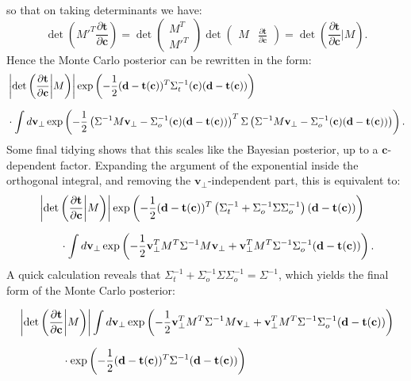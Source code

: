\documentclass[withindex,glossary]{cam-thesis}
\renewcommand{\vec}[1]{\textbf{#1}} %
\begin{document}
so that on taking determinants we have:
\begin{equation}
\det\left( {M'}^T \frac{\partial \vec{t}}{\partial \vec{c}}\right) = \det\begin{pmatrix} M^T \\ {M'}^T \end{pmatrix}\det\begin{pmatrix} M & \displaystyle \frac{\partial \vec{t}}{\partial \vec{c}} \end{pmatrix} = \det\left( \frac{\partial \vec{t}}{\partial \vec{c}} \bigg| M \right).
\end{equation}
Hence the Monte Carlo posterior can be rewritten in the form:
\begin{align}
& \left|\det\left( \frac{\partial \vec{t}}{\partial \vec{c}} \bigg| M \right) \right| \exp\left( -\frac{1}{2}(\vec{d} - \vec{t}(\vec{c}))^T\Sigma_t^{-1}(\vec{c}) (\vec{d} - \vec{t}(\vec{c})) \right)  \notag\\[1.5ex]
& \cdot \int d\vec{v}_{\perp} \exp\left( -\frac{1}{2} \left(\Sigma^{-1} M \vec{v}_{\perp} - \Sigma_o^{-1}(\vec{c}) (\vec{d} - \vec{t}(\vec{c}))\right)^T \Sigma \left(\Sigma^{-1} M \vec{v}_{\perp} - \Sigma_o^{-1}(\vec{c}) (\vec{d} - \vec{t}(\vec{c}))\right) \right).
\end{align}
Some final tidying shows that this scales like the Bayesian posterior, up to a $\vec{c}$-dependent factor. Expanding the argument of the exponential inside the orthogonal integral, and removing the $\vec{v}_{\perp}$-independent part, this is equivalent to:
\begin{align}
& \left|\det\left( \frac{\partial \vec{t}}{\partial \vec{c}} \bigg| M \right) \right| \exp\left( -\frac{1}{2}(\vec{d} - \vec{t}(\vec{c}))^T \left( \Sigma_t^{-1} + \Sigma_o^{-1} \Sigma \Sigma_o^{-1} \right) (\vec{d} - \vec{t}(\vec{c})) \right)  \notag\\[1.5ex]
& \qquad\cdot \int d\vec{v}_{\perp} \exp\left( -\frac{1}{2} \vec{v}_{\perp}^TM^T \Sigma^{-1} M \vec{v}_{\perp} + \vec{v}_{\perp}^T M^T \Sigma^{-1}\Sigma_o^{-1}  (\vec{d} - \vec{t}(\vec{c}))   \right).
\end{align}
\noindent A quick calculation reveals that $\Sigma_t^{-1} + \Sigma_o^{-1} \Sigma \Sigma_o^{-1} = \Sigma^{-1}$, which yields the final form of the Monte Carlo posterior:
\begin{framed}
\begin{align}
&\left|\det\left( \frac{\partial \vec{t}}{\partial \vec{c}} \bigg| M \right) \right| \int d\vec{v}_{\perp} \exp\left( -\frac{1}{2} \vec{v}_{\perp}^TM^T \Sigma^{-1} M \vec{v}_{\perp} + \vec{v}_{\perp}^T M^T \Sigma^{-1}\Sigma_o^{-1}  (\vec{d} - \vec{t}(\vec{c}))   \right) \notag \\[1.5ex]
& \qquad\qquad \cdot \exp\left( -\frac{1}{2}(\vec{d} - \vec{t}(\vec{c}))^T \Sigma^{-1} (\vec{d} - \vec{t}(\vec{c})) \right)
\label{eq:final_mc}
\end{align}
\end{framed}
\end{document}

